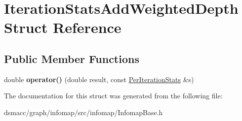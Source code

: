\hypertarget{structIterationStatsAddWeightedDepth}{}\section{Iteration\+Stats\+Add\+Weighted\+Depth Struct Reference}
\label{structIterationStatsAddWeightedDepth}
\subsection*{Public Member Functions}
\begin{DoxyCompactItemize}
\item 
\mbox{\label{structIterationStatsAddWeightedDepth_a161f94412a6506772701b5937d4a7e18}} 
double {\bfseries operator()} (double result, const \mbox{\hyperlink{structPerIterationStats}{Per\+Iteration\+Stats}} \&s)
\end{DoxyCompactItemize}


The documentation for this struct was generated from the following file\+:\begin{DoxyCompactItemize}
\item 
dsmacc/graph/infomap/src/infomap/Infomap\+Base.\+h\end{DoxyCompactItemize}
